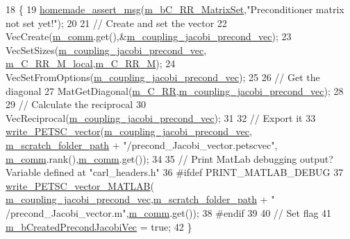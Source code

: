 \begin{DoxyCode}
18 \{
19     \hyperlink{common__header_8h_a593ccc80b790b2268653fcf6597bf451}{homemade\_assert\_msg}(\hyperlink{classcarl_1_1_f_e_t_i___operations_a1f272a523aba46755b2883394947bde0}{m\_bC\_RR\_MatrixSet},\textcolor{stringliteral}{"Preconditioner matrix not
       set yet!"});
20 
21     \textcolor{comment}{// Create and set the vector}
22     VecCreate(\hyperlink{classcarl_1_1_f_e_t_i___operations_a8cb0ed286667fc9f3ebc2d8ef2a3e13b}{m\_comm}.get(),&\hyperlink{classcarl_1_1_f_e_t_i___operations_a1d88407c07e4b6a4802e2f4e49015b32}{m\_coupling\_jacobi\_precond\_vec});
23     VecSetSizes(\hyperlink{classcarl_1_1_f_e_t_i___operations_a1d88407c07e4b6a4802e2f4e49015b32}{m\_coupling\_jacobi\_precond\_vec},
      \hyperlink{classcarl_1_1_f_e_t_i___operations_a2401278970b5cc7087ebbf1746c64d35}{m\_C\_RR\_M\_local},\hyperlink{classcarl_1_1_f_e_t_i___operations_a8212c6fec9ded9faeb36cc3ce18f2e35}{m\_C\_RR\_M});
24     VecSetFromOptions(\hyperlink{classcarl_1_1_f_e_t_i___operations_a1d88407c07e4b6a4802e2f4e49015b32}{m\_coupling\_jacobi\_precond\_vec});
25 
26     \textcolor{comment}{// Get the diagonal}
27     MatGetDiagonal(\hyperlink{classcarl_1_1_f_e_t_i___operations_abd5d326b088db98b2fbe6f2c8cbab5bc}{m\_C\_RR},\hyperlink{classcarl_1_1_f_e_t_i___operations_a1d88407c07e4b6a4802e2f4e49015b32}{m\_coupling\_jacobi\_precond\_vec});
28 
29     \textcolor{comment}{// Calculate the reciprocal}
30     VecReciprocal(\hyperlink{classcarl_1_1_f_e_t_i___operations_a1d88407c07e4b6a4802e2f4e49015b32}{m\_coupling\_jacobi\_precond\_vec});
31 
32     \textcolor{comment}{// Export it}
33     \hyperlink{namespacecarl_a1632084ec1f296b63559648cc9c2047f}{write\_PETSC\_vector}(\hyperlink{classcarl_1_1_f_e_t_i___operations_a1d88407c07e4b6a4802e2f4e49015b32}{m\_coupling\_jacobi\_precond\_vec},
      \hyperlink{classcarl_1_1_f_e_t_i___operations_ad6d35bc9b5221d45452fbc8931f22055}{m\_scratch\_folder\_path} + \textcolor{stringliteral}{"/precond\_Jacobi\_vector.petscvec"},
      \hyperlink{classcarl_1_1_f_e_t_i___operations_a8cb0ed286667fc9f3ebc2d8ef2a3e13b}{m\_comm}.rank(),\hyperlink{classcarl_1_1_f_e_t_i___operations_a8cb0ed286667fc9f3ebc2d8ef2a3e13b}{m\_comm}.get());
34 
35 \textcolor{comment}{// Print MatLab debugging output? Variable defined at "carl\_headers.h"}
36 \textcolor{preprocessor}{#ifdef PRINT\_MATLAB\_DEBUG}
37     \hyperlink{namespacecarl_a25d36e4c1615382a1832d73c716599db}{write\_PETSC\_vector\_MATLAB}(
      \hyperlink{classcarl_1_1_f_e_t_i___operations_a1d88407c07e4b6a4802e2f4e49015b32}{m\_coupling\_jacobi\_precond\_vec},\hyperlink{classcarl_1_1_f_e_t_i___operations_ad6d35bc9b5221d45452fbc8931f22055}{m\_scratch\_folder\_path} + \textcolor{stringliteral}{"
      /precond\_Jacobi\_vector.m"},\hyperlink{classcarl_1_1_f_e_t_i___operations_a8cb0ed286667fc9f3ebc2d8ef2a3e13b}{m\_comm}.get());
38 \textcolor{preprocessor}{#endif}
39 
40     \textcolor{comment}{// Set flag}
41     \hyperlink{classcarl_1_1_f_e_t_i___operations_a49ca6d93078c918d738d64388b74f589}{m\_bCreatedPrecondJacobiVec} = \textcolor{keyword}{true};
42 \}
\end{DoxyCode}
